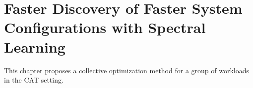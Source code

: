 \chapter{Faster Discovery of Faster System Configurations with Spectral Learning}
\label{chapter:WHAT}

This chapter proposes a collective optimization method
for a group of workloads in the CAT setting.






%

